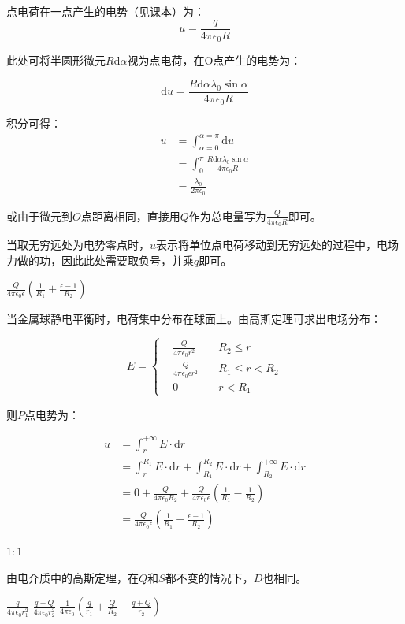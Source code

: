 \documentclass[b5paper,opensource,sourcefont,parskip]{qyxf-book}
\newcommand{\di}[1]{\mathrm{d}#1}
\begin{document}
\solve 点电荷在一点产生的电势（见课本）为：
\[u=\frac{q}{4\pi\epsilon_0 R}\]

此处可将半圆形微元$R\di{\alpha}$视为点电荷，在O点产生的电势为：

\[\di{u}=\frac{R\di{\alpha}\lambda_0\sin\alpha}{4\pi\epsilon_0 R}\]

积分可得：
\begin{align*}
u&=\int_{\alpha=0}^{\alpha=\pi} \di{u}\\
&=\int_0^{\pi} \frac{R\di{\alpha}\lambda_0\sin\alpha}{4\pi\epsilon_0 R}\\
&=\frac{\lambda_0}{2\pi\epsilon_0}
\end{align*}

或由于微元到$O$点距离相同，直接用$Q$作为总电量写为$\frac{Q}{4\pi\epsilon_0 R}$即可。

当取无穷远处为电势零点时，$ u $表示将单位点电荷移动到无穷远处的过程中，电场力做的功，因此此处需要取负号，并乘$q$即可。

 $\frac{Q}{4\pi\epsilon_0\epsilon}\left(\frac{1}{R_1}+\frac{\epsilon-1}{R_2}\right)$

\solve 当金属球静电平衡时，电荷集中分布在球面上。由高斯定理可求出电场分布：

\begin{equation}
E=\left\{
\begin{aligned}
&\frac{Q}{4\pi\epsilon_0 r^2}\quad &R_2\leqslant r\\
&\frac{Q}{4\pi\epsilon_0\epsilon r^2}\quad &R_1\leqslant r<R_2\\
&0	&r<R_1
\end{aligned}
\right.
\end{equation}

则$ P $点电势为：

\begin{align*}
u&=\int_r^{+\infty}E\cdot\di{r}\\
&=\int_r^{R_1}E\cdot\di{r}+\int_{R_1}^{R_2}E\cdot\di{r}+\int_{R_2}^{+\infty}E\cdot\di{r}\\
&=0+\frac{Q}{4\pi\epsilon_0 R_2}+\frac{Q}{4\pi\epsilon_0\epsilon}\left(\frac{1}{R_1}-\frac{1}{R_2}\right)\\
&=\frac{Q}{4\pi\epsilon_0\epsilon}\left(\frac{1}{R_1}+\frac{\epsilon-1}{R_2}\right)
\end{align*}

 $1:1$

\solve 由电介质中的高斯定理，在$ Q $和$ S $都不变的情况下，$ D $也相同。

 $\frac{q}{4\pi \epsilon_0 r_1^2}$ \quad $\frac{q+Q}{4\pi\epsilon_0 r_2^2}$ \quad $\frac{1}{4\pi\epsilon_0}\left(\frac{q}{r_1}+\frac{Q}{R_2}-\frac{q+Q}{r_2}\right)$
\end{document}
